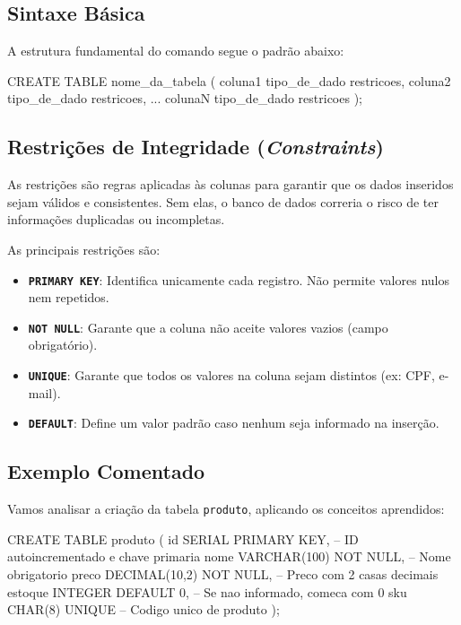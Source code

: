 \subsection{Sintaxe Básica}

A estrutura fundamental do comando segue o padrão abaixo:

\begin{sqlcode}
CREATE TABLE nome_da_tabela (
    coluna1 tipo_de_dado restricoes,
    coluna2 tipo_de_dado restricoes,
    ...
    colunaN tipo_de_dado restricoes
);
\end{sqlcode}



\subsection{Restrições de Integridade (\textit{Constraints})}

As restrições são regras aplicadas às colunas para garantir que os dados inseridos sejam válidos e consistentes. Sem elas, o banco de dados correria o risco de ter informações duplicadas ou incompletas.

As principais restrições são:

\begin{itemize}
    \item \textbf{\texttt{PRIMARY KEY}}: Identifica unicamente cada registro. Não permite valores nulos nem repetidos.
    \item \textbf{\texttt{NOT NULL}}: Garante que a coluna não aceite valores vazios (campo obrigatório).
    \item \textbf{\texttt{UNIQUE}}: Garante que todos os valores na coluna sejam distintos (ex: CPF, e-mail).
    \item \textbf{\texttt{DEFAULT}}: Define um valor padrão caso nenhum seja informado na inserção.
\end{itemize}

\subsection{Exemplo Comentado}

Vamos analisar a criação da tabela \texttt{produto}, aplicando os conceitos aprendidos:

\begin{sqlcode}
CREATE TABLE produto (
    id SERIAL PRIMARY KEY,            -- ID autoincrementado e chave primaria
    nome VARCHAR(100) NOT NULL,      -- Nome obrigatorio
    preco DECIMAL(10,2) NOT NULL,    -- Preco com 2 casas decimais
    estoque INTEGER DEFAULT 0,       -- Se nao informado, comeca com 0
    sku CHAR(8) UNIQUE               -- Codigo unico de produto
);
\end{sqlcode}



